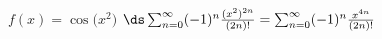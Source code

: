 {$f(x) = \cos \big(x^2\big)$
}
{$\ds \sum_{n=0}^\infty (-1)^n\frac{(x^2)^{2n}}{(2n)!} = \sum_{n=0}^\infty (-1)^n\frac{x^{4n}}{(2n)!}$
}